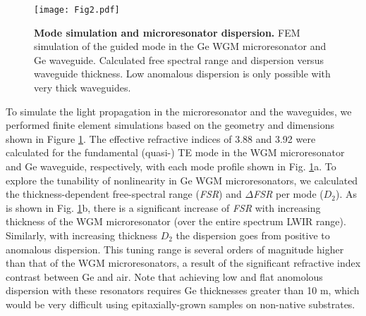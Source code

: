 \documentclass[fleqn,10pt,twocolumn]{wlscirep}
\begin{document}
\begin{figure}[ht!]
    \texttt{[image: Fig2.pdf]}
    \caption{\label{fig:sim}\textbf{Mode simulation and microresonator dispersion.}  FEM simulation of the guided mode in the Ge WGM microresonator and Ge waveguide.  Calculated free spectral range and dispersion versus waveguide thickness. Low anomalous dispersion is only possible with very thick waveguides.}
\end{figure}
To simulate the light propagation in the microresonator and the waveguides, we performed finite element simulations based on the geometry and dimensions shown in Figure \ref{fig:sim}. The effective refractive indices of 3.88 and 3.92 were calculated for the fundamental (quasi-) TE mode in the WGM microresonator and Ge waveguide, respectively, with each mode profile shown in Fig. \ref{fig:sim}a. To explore the tunability of nonlinearity in Ge WGM microresonators, we calculated the thickness-dependent free-spectral range (\emph{FSR}) and \emph{$\Delta$FSR} per mode ($D_{2}$). As is shown in Fig. \ref{fig:sim}b, there is a significant increase of \emph{FSR} with increasing thickness of the WGM microresonator (over the entire spectrum LWIR range). Similarly, with increasing thickness $D_{2}$ the dispersion goes from positive to anomalous dispersion. This tuning range is several orders of magnitude higher than that of the  WGM microresonators, a result of the significant refractive index contrast between Ge and air\cite{yangBroadbandDispersionengineeredMicroresonator2016}. Note that achieving low and flat anomolous dispersion with these resonators requires Ge thicknesses greater than 10 \micro m, which would be very difficult using epitaxially-grown samples on non-native substrates.
\end{document}

